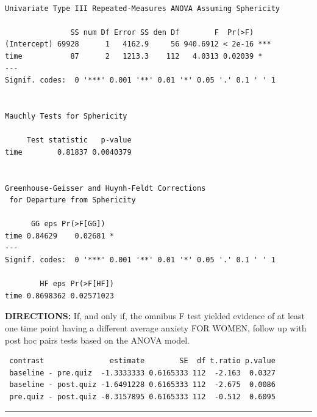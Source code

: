 \documentclass[]{article}
\newenvironment{Shaded}{\begin{snugshade}}{\end{snugshade}}
\newcommand{\KeywordTok}[1]{\textcolor[rgb]{0.13,0.29,0.53}{\textbf{#1}}}
\newcommand{\DataTypeTok}[1]{\textcolor[rgb]{0.13,0.29,0.53}{#1}}
\newcommand{\StringTok}[1]{\textcolor[rgb]{0.31,0.60,0.02}{#1}}
\newcommand{\CommentTok}[1]{\textcolor[rgb]{0.56,0.35,0.01}{\textit{#1}}}
\newcommand{\OperatorTok}[1]{\textcolor[rgb]{0.81,0.36,0.00}{\textbf{#1}}}
\newcommand{\NormalTok}[1]{#1}
\begin{document}
\begin{verbatim}

Univariate Type III Repeated-Measures ANOVA Assuming Sphericity

               SS num Df Error SS den Df        F  Pr(>F)    
(Intercept) 69928      1   4162.9     56 940.6912 < 2e-16 ***
time           87      2   1213.3    112   4.0313 0.02039 *  
---
Signif. codes:  0 '***' 0.001 '**' 0.01 '*' 0.05 '.' 0.1 ' ' 1


Mauchly Tests for Sphericity

     Test statistic   p-value
time        0.81837 0.0040379


Greenhouse-Geisser and Huynh-Feldt Corrections
 for Departure from Sphericity

      GG eps Pr(>F[GG])  
time 0.84629    0.02681 *
---
Signif. codes:  0 '***' 0.001 '**' 0.01 '*' 0.05 '.' 0.1 ' ' 1

        HF eps Pr(>F[HF])
time 0.8698362 0.02571023
\end{verbatim}

\clearpage

\textbf{DIRECTIONS:} If, and only if, the omnibus F test yielded
evidence of at least one time point having a different average anxiety
FOR WOMEN, follow up with post hoc pairs tests based on the ANOVA model.

\begin{Shaded}
\end{Shaded}

\begin{verbatim}
 contrast               estimate        SE  df t.ratio p.value
 baseline - pre.quiz  -1.3333333 0.6165333 112  -2.163  0.0327
 baseline - post.quiz -1.6491228 0.6165333 112  -2.675  0.0086
 pre.quiz - post.quiz -0.3157895 0.6165333 112  -0.512  0.6095
\end{verbatim}

\begin{center}\rule{0.5\linewidth}{\linethickness}\end{center}
\end{document}
